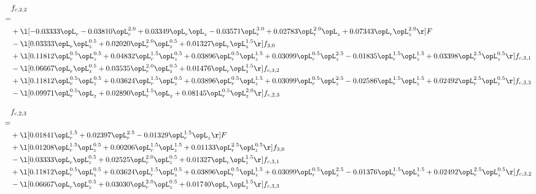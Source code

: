 \begin{alignat}{2} 
\label{eq:f_22_2} 
& f_{c,2,2} \nonumber \\ 
 = \\ 
& + \l[  -0.03333 \opL_r   -0.03810 \opL_r^{2.0} +  0.03349 \opL_r \opL_z   -0.03571 \opL_r^{3.0} +  0.02783 \opL_r^{2.0} \opL_z +  0.07343 \opL_r \opL_z^{2.0}  \r] F \nonumber \\ 
& - \l[  0.03333 \opL_r \opL_z^{0.5} +  0.02020 \opL_r^{2.0} \opL_z^{0.5} +  0.01327 \opL_r \opL_z^{1.5}  \r] f_{3,0} \nonumber \\ 
& + \l[  0.11812 \opL_r^{0.5} \opL_z^{0.5} +  0.04832 \opL_r^{1.5} \opL_z^{0.5} +  0.03896 \opL_r^{0.5} \opL_z^{1.5} +  0.03099 \opL_r^{0.5} \opL_z^{2.5}   -0.01835 \opL_r^{1.5} \opL_z^{1.5} +  0.03398 \opL_r^{2.5} \opL_z^{0.5}  \r] f_{c,3,1} \nonumber \\ 
& - \l[  0.06667 \opL_r \opL_z^{0.5} +  0.03535 \opL_r^{2.0} \opL_z^{0.5} +  0.01476 \opL_r \opL_z^{1.5}  \r] f_{c,3,2} \nonumber \\ 
& + \l[  0.11812 \opL_r^{0.5} \opL_z^{0.5} +  0.03624 \opL_r^{1.5} \opL_z^{0.5} +  0.03896 \opL_r^{0.5} \opL_z^{1.5} +  0.03099 \opL_r^{0.5} \opL_z^{2.5}   -0.02586 \opL_r^{1.5} \opL_z^{1.5} +  0.02492 \opL_r^{2.5} \opL_z^{0.5}  \r] f_{c,3,3} \nonumber \\ 
& - \l[  0.09971 \opL_r^{0.5} \opL_z +  0.02890 \opL_r^{1.5} \opL_z +  0.08145 \opL_r^{0.5} \opL_z^{2.0}  \r] f_{c,2,3} \nonumber \\ 
\end{alignat} 


\begin{alignat}{2} 
\label{eq:f_23_2} 
& f_{c,2,3} \nonumber \\ 
 = \\ 
& + \l[  0.01841 \opL_r^{1.5} +  0.02397 \opL_r^{2.5}   -0.01329 \opL_r^{1.5} \opL_z  \r] F \nonumber \\ 
& + \l[  0.01208 \opL_r^{1.5} \opL_z^{0.5} +  0.00206 \opL_r^{1.5} \opL_z^{1.5} +  0.01133 \opL_r^{2.5} \opL_z^{0.5}  \r] f_{3,0} \nonumber \\ 
& - \l[  0.03333 \opL_r \opL_z^{0.5} +  0.02525 \opL_r^{2.0} \opL_z^{0.5} +  0.01327 \opL_r \opL_z^{1.5}  \r] f_{c,3,1} \nonumber \\ 
& + \l[  0.11812 \opL_r^{0.5} \opL_z^{0.5} +  0.03624 \opL_r^{1.5} \opL_z^{0.5} +  0.03896 \opL_r^{0.5} \opL_z^{1.5} +  0.03099 \opL_r^{0.5} \opL_z^{2.5}   -0.01376 \opL_r^{1.5} \opL_z^{1.5} +  0.02492 \opL_r^{2.5} \opL_z^{0.5}  \r] f_{c,3,2} \nonumber \\ 
& - \l[  0.06667 \opL_r \opL_z^{0.5} +  0.03030 \opL_r^{2.0} \opL_z^{0.5} +  0.01740 \opL_r \opL_z^{1.5}  \r] f_{c,3,3} \nonumber \\ 
\end{alignat} 


